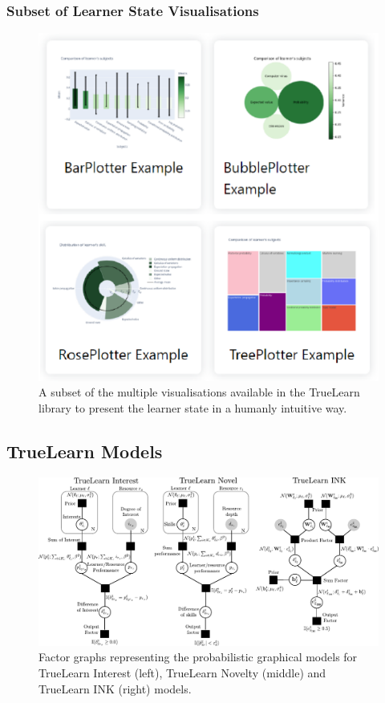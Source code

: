 \documentclass[letterpaper]{article} %
\begin{document}
\subsubsection{Subset of Learner State Visualisations}
\begin{figure}[h!]
\begin{center}
    \centerline{\includegraphics[width=\linewidth]{vis_plots.pdf}}
    \caption{A subset of the multiple visualisations available in the TrueLearn library to present the learner state in a humanly intuitive way.}
\end{center}
\end{figure}

\newpage
\subsection{TrueLearn Models}

\begin{figure}[h]
\begin{center}
\centerline{\includegraphics[width=.75\linewidth]{TrueLearn_models.pdf}}
\caption{Factor graphs representing the probabilistic graphical models for TrueLearn Interest (left), TrueLearn Novelty (middle) and TrueLearn INK (right) models.}
\end{center}
\end{figure}
\end{document}
